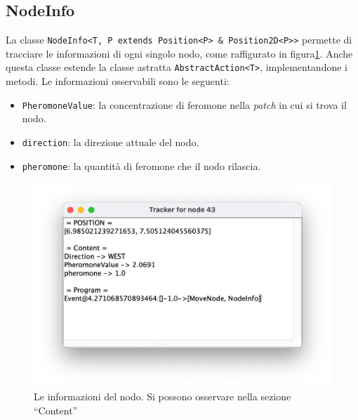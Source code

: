 \subsection{NodeInfo}
La classe \texttt{NodeInfo<T, P extends Position<P> \& Position2D<P>>} permette di tracciare le informazioni di ogni singolo nodo, come
raffigurato in figura\space\cref{fig:nodeinfo}. Anche questa
classe estende la classe astratta \texttt{AbstractAction<T>}, implementandone i metodi. Le informazioni osservabili sono le seguenti:
\begin{itemize}
    \item \texttt{PheromoneValue}: la concentrazione di feromone nella \textit{patch} in cui si trova il nodo.
    \item \texttt{direction}: la direzione attuale del nodo.
    \item \texttt{pheromone}: la quantità di feromone che il nodo rilascia.
\end{itemize}
\begin{figure}
    \centering
    \includegraphics[width=.7\linewidth]{figures/nodeinfo.jpg}
    \caption{Le informazioni del nodo. Si possono osservare nella sezione ``Content''}\label{fig:nodeinfo}
\end{figure}
\clearpage

